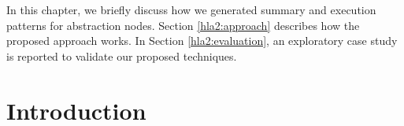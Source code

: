 \label{chapter:hla2}
In this chapter, we briefly discuss how we generated summary and execution patterns for abstraction nodes. Section \ref{hla2:approach} describes how the proposed approach works. In Section \ref{hla2:evaluation}, an exploratory case study is reported to validate our proposed techniques.


\section{Introduction}

